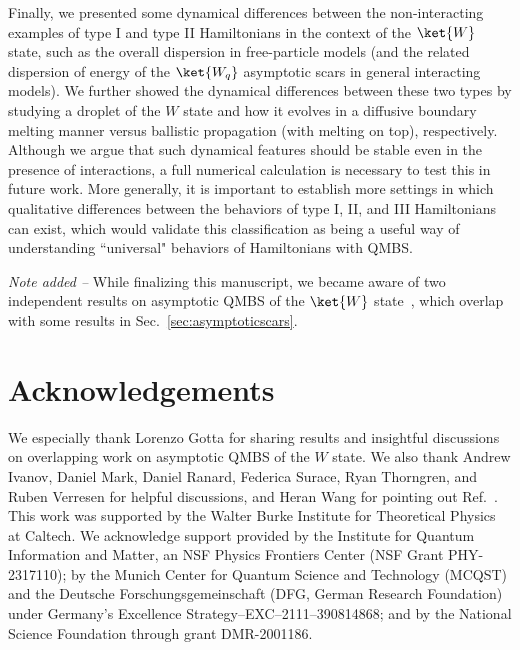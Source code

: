 \documentclass[prx,letterpaper,aps,superscriptaddress,floatfix,twocolumn,nofootinbib]{revtex4-2}
\makeatletter
\theoremstyle{definition}
\renewcommand\onecolumngrid{%
  \do@columngrid{one}{\@ne}%
  \def\set@footnotewidth{\onecolumngrid}%
  \def\footnoterule{\kern-6pt\hrule width 1.5in\kern6pt}%
}
\makeatother
\begin{document}
%
Finally, we presented some dynamical differences between the non-interacting examples of type I and type II Hamiltonians in the context of the $\ket{W}$ state, such as the overall dispersion in free-particle models (and the related dispersion of energy of the $\ket{W_q}$ asymptotic scars in general interacting models).
We further showed the dynamical differences between these two types by studying a droplet of the $W$ state and how it evolves in a diffusive boundary melting manner versus ballistic propagation (with melting on top), respectively.
%
Although we argue that such dynamical features should be stable even in the presence of interactions, a full numerical calculation is necessary to test this in future work.
%
More generally, it is important to establish more settings in which qualitative differences between the behaviors of type I, II, and III Hamiltonians can exist, which would validate this classification as being a useful way of understanding ``universal" behaviors of Hamiltonians with QMBS. 
%

%
\textit{Note added --} While finalizing this manuscript, we became aware of two independent results on asymptotic QMBS of the $\ket{W}$ state~\cite{gotta2025asymptotic, dooley2025asymptotic}, which overlap with some results in Sec.~\ref{sec:asymptoticscars}.
%

\section*{Acknowledgements}
We especially thank Lorenzo Gotta for sharing results and insightful discussions on overlapping work on asymptotic QMBS of the $W$ state.
%
We also thank Andrew Ivanov, Daniel Mark, Daniel Ranard, Federica Surace, Ryan Thorngren, and Ruben Verresen for helpful discussions, and Heran Wang for pointing out Ref.~\cite{wang2024generalizedspinhelixstates}.
%
This work was supported by the Walter Burke Institute for Theoretical Physics at Caltech.
%
We acknowledge support provided by the Institute for Quantum Information and Matter, an NSF Physics Frontiers Center (NSF Grant PHY-2317110); by the Munich Center for Quantum Science and Technology (MCQST) and the Deutsche Forschungsgemeinschaft (DFG, German Research Foundation) under Germany’s Excellence Strategy--EXC--2111--390814868; and by the National Science Foundation through grant DMR-2001186.
%



\clearpage         
\onecolumngrid  
\end{document}
